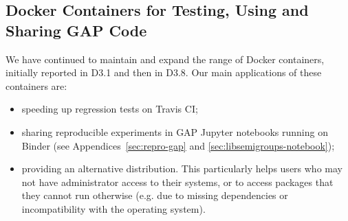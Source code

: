 %
%


\subsection{Docker Containers for Testing, Using and Sharing GAP Code}\label{docker}

We have continued to maintain and expand the range of Docker containers,
initially reported in D3.1 and then in D3.8. Our main applications of
these containers are:
\begin{itemize}
\item speeding up regression tests on Travis CI;
\item sharing reproducible experiments in GAP Jupyter notebooks running on
  Binder (see Appendices~\ref{sec:repro-gap} and
  \ref{sec:libsemigroups-notebook});
\item providing an alternative distribution.
This particularly helps users who may not have administrator access
  to their systems, or to access packages that they cannot run otherwise
  (e.g. due to missing dependencies or incompatibility with the operating system).
\end{itemize}

